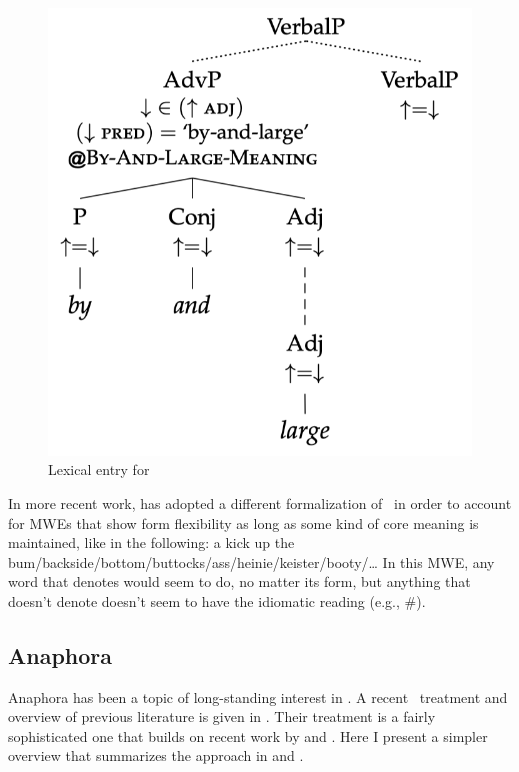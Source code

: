 \documentclass[output=paper,hidelinks]{langscibook}
\begin{document}
\begin{figure}
  \centering
  \includegraphics[scale=.5]{figures/Glue/by-and-large.png}
  \caption{\label{fig:by-and-large} Lexical entry for    \citep[265; used with permission]{findlay2019}}
\end{figure}

\newpage
In more recent work, \citet{findlay2021} has
adopted a different formalization of \glue\, in order to account for
MWEs that show form flexibility as long as some kind of core meaning
is maintained, like in the following:
\ea a kick up the bum/backside/bottom/buttocks/ass/heinie/keister/booty/\ldots
\z
%
In this MWE, any word that denotes  would seem to do,
no matter its form, but anything that doesn't denote 
doesn't seem to have the idiomatic  reading (e.g.,
\#).

\subsection{Anaphora}

Anaphora has been a topic of long-standing interest in \glues. A
recent \lfgglue\ treatment and overview of previous literature is given in
\citet[ch.\,14]{DLM:LFG}. Their treatment is a fairly 
sophisticated one that builds on recent work by
\citet{Haug2014} and \citet{DalrympleAl17}. Here I present a simpler
overview that summarizes the approach in \citet{dalrymple;ea97b} and
\citet{Asudeh2004,Asudeh12}. 
\end{document}
